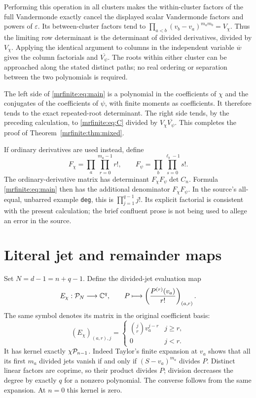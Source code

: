 \documentclass[11pt]{article}
\begin{document}
Performing this operation in all clusters makes the within-cluster
factors of the full Vandermonde exactly cancel the displayed scalar
Vandermonde factors and powers of \(\varepsilon\). Its between-cluster
factors tend to \(\prod_{a<b}(v_b-v_a)^{m_am_b}=V_\chi\).
Thus the limiting row determinant is the determinant of divided
derivatives, divided by \(V_\chi\). Applying the identical argument to
columns in the independent variable \(\overline w\) gives the column
factorials and \(\overline{V_\psi}\). The roots within either cluster
can be approached along the stated distinct paths; no real ordering or
separation between the two polynomials is required.

The left side of \eqref{mrfinite:eq:main} is a polynomial in the coefficients of
\(\chi\) and the conjugates of the coefficients of \(\psi\), with
finite moments as coefficients. It therefore tends to the exact
repeated-root determinant. The right side tends, by the preceding
calculation, to \eqref{mrfinite:eq:C} divided by
\(V_\chi\overline{V_\psi}\). This completes the proof of
Theorem~\ref{mrfinite:thm:mixed}.

If ordinary derivatives are used instead, define
\[
 F_\chi=\prod_a\prod_{r=0}^{m_a-1}r!,\qquad
 F_\psi=\prod_b\prod_{s=0}^{\ell_b-1}s!.
\]
The ordinary-derivative matrix has determinant
\(F_\chi F_\psi\det C_n\). Formula \eqref{mrfinite:eq:main} then has the
additional denominator \(F_\chi F_\psi\).
In the source's all-equal, unbarred example \texttt{deg}, this is
\(\prod_{j=1}^{q-1}j!\). Its explicit factorial is consistent with the
present calculation; the brief confluent prose is not being used to
allege an error in the source.

\section{Literal jet and remainder maps}\label{mrfinite:sec:maps}

Set \(N=d-1=n+q-1\). Define the divided-jet evaluation map
\begin{equation}\label{mrfinite:eq:E}
 E_\chi:\mathcal P_N\longrightarrow\mathbb C^q,
 \qquad P\longmapsto
       \left(\frac{P^{(r)}(v_a)}{r!}\right)_{(a,r)}.
\end{equation}
The same symbol denotes its matrix in the original coefficient basis:
\[
 (E_\chi)_{(a,r),j}=
 \begin{cases}\binom jr v_a^{j-r}&j\geq r,\\0&j<r.\end{cases}
\]
It has kernel exactly \(\chi\mathcal P_{n-1}\). Indeed Taylor's finite
expansion at \(v_a\) shows that all its first \(m_a\) divided jets
vanish if and only if \((S-v_a)^{m_a}\) divides \(P\). Distinct linear
factors are coprime, so their product divides \(P\); division decreases
the degree by exactly \(q\) for a nonzero polynomial. The converse
follows from the same expansion. At \(n=0\) this kernel is zero.
\end{document}
